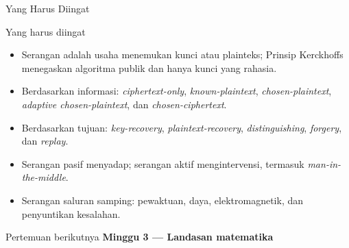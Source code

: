\documentclass[aspectratio=169,11pt]{beamer}
\begin{document}
\begin{frame}{Yang Harus Diingat}
    \footnotesize
    \begin{block}{Yang harus diingat}
        \begin{itemize}
            \item Serangan adalah usaha menemukan kunci atau plainteks;
                  Prinsip Kerckhoffs menegaskan algoritma publik dan hanya
                  kunci yang rahasia.
            \item Berdasarkan informasi: \textit{ciphertext-only},
                  \textit{known-plaintext}, \textit{chosen-plaintext},
                  \textit{adaptive chosen-plaintext}, dan
                  \textit{chosen-ciphertext}.
            \item Berdasarkan tujuan: \textit{key-recovery},
                  \textit{plaintext-recovery}, \textit{distinguishing},
                  \textit{forgery}, dan \textit{replay}.
            \item Serangan pasif menyadap; serangan aktif mengintervensi,
                  termasuk \textit{man-in-the-middle}.
            \item Serangan saluran samping: pewaktuan, daya, elektromagnetik,
                  dan penyuntikan kesalahan.
        \end{itemize}
    \end{block}
    \vspace{0.35cm}
    \begin{exampleblock}{Pertemuan berikutnya}
        \textbf{Minggu 3 --- Landasan matematika}
    \end{exampleblock}
\end{frame}
\end{document}
